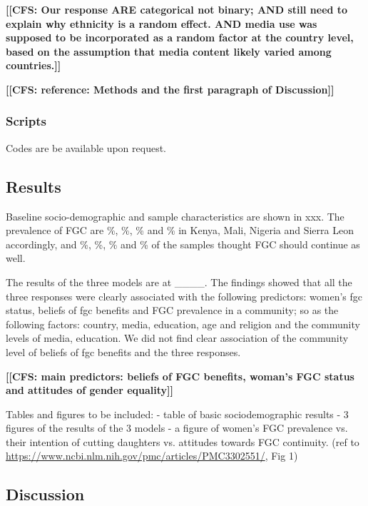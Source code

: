 \documentclass[12pt,]{article}
\newcommand{\comment}[1]{\textbf{[[#1]]}}
\newcommand{\cfcmt}[1]{\comment{CFS: #1}}
\begin{document}
\cfcmt{Our response ARE categorical not binary; AND still need to explain why ethnicity is a random effect. AND media use was supposed to be incorporated as a random factor at the country level, based on the assumption that media content likely varied among countries.}

\cfcmt{reference: Methods and the first paragraph of Discussion\cite{Chia14}}


\subsubsection{Scripts}\label{scripts}

Codes are be available upon request. 


\subsection{Results}\label{results-1}

Baseline socio-demographic and sample characteristics are shown in xxx.  The prevalence of FGC are \%, \%, \% and \% in Kenya, Mali, Nigeria and Sierra Leon accordingly, and \%, \%, \% and \%  of the samples thought FGC should continue as well.  

The results of the three models are at ____.  The findings showed that all the three responses were clearly associated with the following predictors:  women’s fgc status, beliefs of fgc benefits and FGC prevalence in a community; so as the following factors:  country, media, education, age and religion and the community levels of media, education.  We did not find clear association of the community level of beliefs of fgc benefits and the three responses.


\cfcmt{main predictors:  beliefs of FGC benefits, woman's FGC status and attitudes of gender equality}

Tables and figures to be included:
- table of basic sociodemographic results
- 3 figures of the results of the 3 models
- a figure of women’s FGC prevalence vs. their intention of cutting daughters vs. attitudes towards FGC continuity.  (ref to \url{https://www.ncbi.nlm.nih.gov/pmc/articles/PMC3302551/}, Fig 1)



\subsection{Discussion}\label{Discussion}
\end{document}
